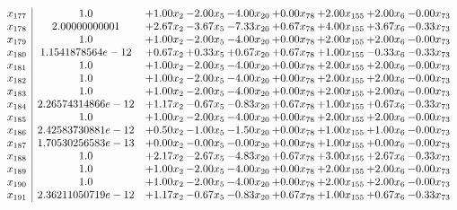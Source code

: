 \documentclass[8pt]{article}
\begin{document}
\[\begin{array}{c| c c@{\hskip 2pt} c@{\hskip 2pt} c@{\hskip 2pt} c@{\hskip 2pt} c@{\hskip 2pt} c@{\hskip 2pt} c@{\hskip 2pt} }
 x_{177}   &  1.0 & +  1.00 x_{2} & -2.00 x_{5} & -4.00 x_{20} & +  0.00 x_{78} & +  2.00 x_{155} & +  2.00 x_{6} & -0.00 x_{73}\\
 x_{178}   &  2.00000000001 & +  2.67 x_{2} & -3.67 x_{5} & -7.33 x_{20} & +  0.67 x_{78} & +  4.00 x_{155} & +  3.67 x_{6} & -0.33 x_{73}\\
 x_{179}   &  1.0 & +  1.00 x_{2} & -2.00 x_{5} & -4.00 x_{20} & +  0.00 x_{78} & +  2.00 x_{155} & +  2.00 x_{6} & -0.00 x_{73}\\
 x_{180}   &  1.1541878564e-12 & +  0.67 x_{2} & +  0.33 x_{5} & +  0.67 x_{20} & +  0.67 x_{78} & +  1.00 x_{155} & -0.33 x_{6} & -0.33 x_{73}\\
 x_{181}   &  1.0 & +  1.00 x_{2} & -2.00 x_{5} & -4.00 x_{20} & +  0.00 x_{78} & +  2.00 x_{155} & +  2.00 x_{6} & -0.00 x_{73}\\
 x_{182}   &  1.0 & +  1.00 x_{2} & -2.00 x_{5} & -4.00 x_{20} & +  0.00 x_{78} & +  2.00 x_{155} & +  2.00 x_{6} & -0.00 x_{73}\\
 x_{183}   &  1.0 & +  1.00 x_{2} & -2.00 x_{5} & -4.00 x_{20} & +  0.00 x_{78} & +  2.00 x_{155} & +  2.00 x_{6} & -0.00 x_{73}\\
 x_{184}   &  2.26574314866e-12 & +  1.17 x_{2} & -0.67 x_{5} & -0.83 x_{20} & +  0.67 x_{78} & +  1.00 x_{155} & +  0.67 x_{6} & -0.33 x_{73}\\
 x_{185}   &  1.0 & +  1.00 x_{2} & -2.00 x_{5} & -4.00 x_{20} & +  0.00 x_{78} & +  2.00 x_{155} & +  2.00 x_{6} & -0.00 x_{73}\\
 x_{186}   &  2.42583730881e-12 & +  0.50 x_{2} & -1.00 x_{5} & -1.50 x_{20} & +  0.00 x_{78} & +  1.00 x_{155} & +  1.00 x_{6} & -0.00 x_{73}\\
 x_{187}   &  1.70530256583e-13 & +  0.00 x_{2} & -0.00 x_{5} & -0.00 x_{20} & +  0.00 x_{78} & +  1.00 x_{155} & +  0.00 x_{6} & -0.00 x_{73}\\
 x_{188}   &  1.0 & +  2.17 x_{2} & -2.67 x_{5} & -4.83 x_{20} & +  0.67 x_{78} & +  3.00 x_{155} & +  2.67 x_{6} & -0.33 x_{73}\\
 x_{189}   &  1.0 & +  1.00 x_{2} & -2.00 x_{5} & -4.00 x_{20} & +  0.00 x_{78} & +  2.00 x_{155} & +  2.00 x_{6} & -0.00 x_{73}\\
 x_{190}   &  1.0 & +  1.00 x_{2} & -2.00 x_{5} & -4.00 x_{20} & +  0.00 x_{78} & +  2.00 x_{155} & +  2.00 x_{6} & -0.00 x_{73}\\
 x_{191}   &  2.36211050719e-12 & +  1.17 x_{2} & -0.67 x_{5} & -0.83 x_{20} & +  0.67 x_{78} & +  1.00 x_{155} & +  0.67 x_{6} & -0.33 x_{73}\\

\end{array}\]
\end{document}
